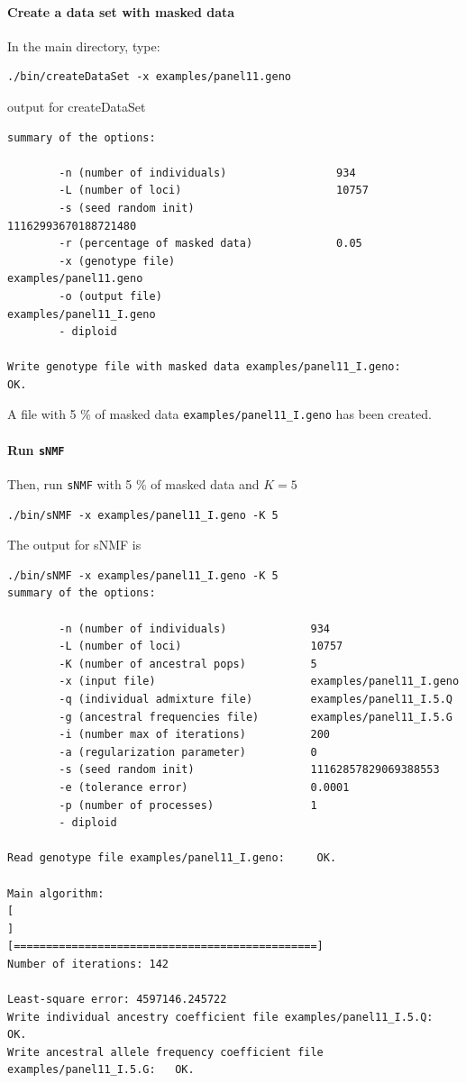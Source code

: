 \documentclass[10pt,a4paper]{article}
\begin{document}
\paragraph{Create a data set with masked data}

In the main directory, type:
\begin{Verbatim}[frame=single]
./bin/createDataSet -x examples/panel11.geno
\end{Verbatim}
\noindent
output for createDataSet
\begin{Verbatim}[frame=single]
summary of the options:

        -n (number of individuals)                 934
        -L (number of loci)                        10757
        -s (seed random init)                      11162993670188721480
        -r (percentage of masked data)             0.05
        -x (genotype file)                         examples/panel11.geno
        -o (output file)                           examples/panel11_I.geno
        - diploid

Write genotype file with masked data examples/panel11_I.geno:		OK.
\end{Verbatim}
\noindent
A file with 5 \% of masked data \verb|examples/panel11_I.geno| has been created.

\paragraph{Run {\tt sNMF}}

Then, run {\tt sNMF} with 5 \% of masked data and $K=5$
\begin{Verbatim}[frame=single]
./bin/sNMF -x examples/panel11_I.geno -K 5
\end{Verbatim}
\noindent
The output for sNMF is
\begin{Verbatim}[frame=single]
./bin/sNMF -x examples/panel11_I.geno -K 5 
summary of the options:

        -n (number of individuals)             934
        -L (number of loci)                    10757
        -K (number of ancestral pops)          5
        -x (input file)                        examples/panel11_I.geno
        -q (individual admixture file)         examples/panel11_I.5.Q
        -g (ancestral frequencies file)        examples/panel11_I.5.G
        -i (number max of iterations)          200
        -a (regularization parameter)          0
        -s (seed random init)                  11162857829069388553
        -e (tolerance error)                   0.0001
        -p (number of processes)               1
        - diploid

Read genotype file examples/panel11_I.geno:		OK.

Main algorithm:
[                                                                           ]
[===============================================]
Number of iterations: 142

Least-square error: 4597146.245722
Write individual ancestry coefficient file examples/panel11_I.5.Q:		OK.
Write ancestral allele frequency coefficient file examples/panel11_I.5.G:	OK.
\end{Verbatim}
\end{document}
